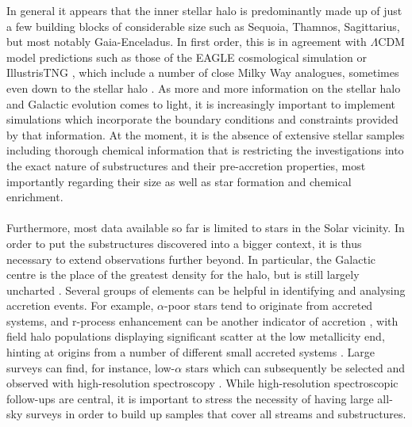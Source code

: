 \documentclass[a4paper,11pt]{article}
\begin{document}
%
In general it appears that the inner stellar halo is predominantly made up of just a few building blocks of considerable size such as Sequoia, Thamnos, Sagittarius, but most notably Gaia-Enceladus. In first order, this is in agreement with $\Lambda$CDM model predictions such as those of the EAGLE cosmological simulation \citep{eagle} or IllustrisTNG \citep{illustristng}, which include a number of close Milky Way analogues, sometimes even down to the stellar halo \citep{bignone19}. As more and more information on the stellar halo and Galactic evolution comes to light, it is increasingly important to implement simulations which incorporate the boundary conditions and constraints provided by that information. At the moment, it is the absence of extensive stellar samples including thorough chemical information that is restricting the investigations into the exact nature of substructures and their pre-accretion properties, most importantly regarding their size as well as star formation and chemical enrichment.\\ \\
%
Furthermore, most data available so far is limited to stars in the Solar vicinity. In order to put the substructures discovered into a bigger context, it is thus necessary to extend observations further beyond. In particular, the Galactic centre is the place of the greatest density for the halo, but is still largely uncharted \citep{helmi20}. Several groups of elements can be helpful in identifying and analysing accretion events. For example, $\alpha$-poor stars tend to originate from accreted systems, and r-process enhancement can be another indicator of accretion \citep{sakari18}, with field halo populations displaying significant scatter at the low metallicity end, hinting at origins from a number of different small accreted systems \citep{roederer18}. Large surveys can find, for instance, low-$\alpha$ stars which can subsequently be selected and observed with high-resolution spectroscopy \citep{helmi20}. While high-resolution spectroscopic follow-ups are central, it is important to stress the necessity of having large all-sky surveys in order to build up samples that cover all streams and substructures.
%
\end{document}
